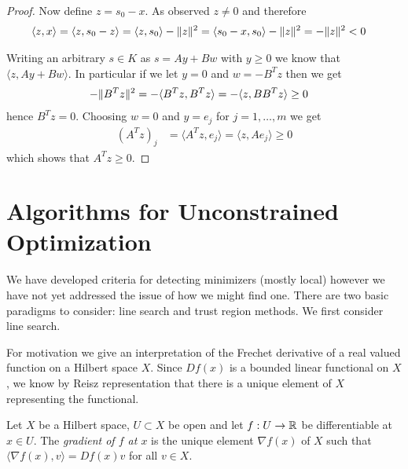 \begin{proof}
Now define $z = s_0 - x$.  As observed $z \neq 0$ and therefore
\begin{align*}
\langle z, x \rangle &= \langle z, s_0 - z \rangle = \langle z, s_0 \rangle - \lVert z \rVert^2 = \langle s_0 - x, s_0 \rangle - \lVert z \rVert^2 = - \lVert z \rVert^2 < 0
\end{align*}

Writing an arbitrary $s \in K$ as $s = A y + B w$ with $y \geq 0$ we know that $\langle z, A y + B w \rangle$.  In particular if we let $y = 0$ and
$w = -B^T z$ then we get 
\begin{align*}
-\lVert B^T z \rVert^2 &= -\langle B^T z, B^T z \rangle= -\langle z, B B^T z \rangle \geq 0
\end{align*}
hence $B^T z = 0$.  Choosing $w=0$ and $y = e_j$ for $j=1, \dotsc, m$ we get
\begin{align*}
(A^Tz)_j &= \langle A^T z, e_j \rangle = \langle z , A e_j \rangle \geq 0
\end{align*}
which shows that $A^T z \geq 0$.
\end{proof}

\section{Algorithms for Unconstrained Optimization}

We have developed criteria for detecting minimizers (mostly local)
however we have not yet addressed the issue of how we might find one.
There are two basic paradigms to consider: line search and trust
region methods.  We first consider line search.

For motivation we give an interpretation of the Frechet derivative of
a real valued function on a Hilbert space $X$.  Since $Df(x)$ is a
bounded linear functional on $X$, we know by Reisz
representation that there is a unique element of $X$ representing the
functional.

\begin{defn}Let $X$ be a Hilbert space, $U \subset X$ be open and let
  $f : U \to \mathbb{R}$ be differentiable at $x \in U$.  The
  \emph{gradient of $f$ at $x$} is the unique element $\nabla f(x)$ of
  $X$ such that $\langle \nabla f(x), v \rangle = Df(x) v$ for all $v
  \in X$.
\end{defn}

